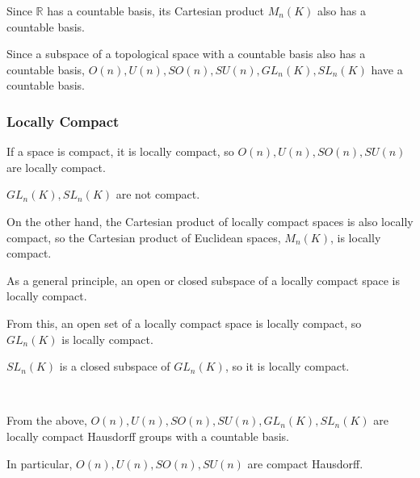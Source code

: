 \documentclass[uplatex,a4j,12pt,dvipdfmx]{jsarticle}
\begin{document}
Since $\mathbb{R}$ has a countable basis, its Cartesian product $M_{n}(K)$ also has a countable basis.

Since a subspace of a topological space with a countable basis also has a countable basis,
$O(n),U(n),SO(n),SU(n),GL_{n}(K),SL_{n}(K)$ have a countable basis.

\subsubsection{\textbf{Locally Compact}}

If a space is compact, it is locally compact, so
$O(n),U(n),SO(n),SU(n)$ are locally compact.

$GL_{n}(K), SL_{n}(K)$ are not compact.

On the other hand, the Cartesian product of locally compact spaces is also locally compact, so
the Cartesian product of Euclidean spaces, $M_{n}(K)$, is locally compact.

As a general principle, an open or closed subspace of a locally compact space is locally compact.

From this, an open set of a locally compact space is locally compact, so $GL_{n}(K)$ is locally compact.

$SL_{n}(K)$ is a closed subspace of $GL_{n}(K)$, so it is locally compact.

\ \ 

From the above,
$O(n),U(n),SO(n),SU(n),GL_{n}(K),SL_{n}(K)$
are locally compact Hausdorff groups with a countable basis.

In particular,
$O(n),U(n),SO(n),SU(n)$
are compact Hausdorff.
\end{document}
